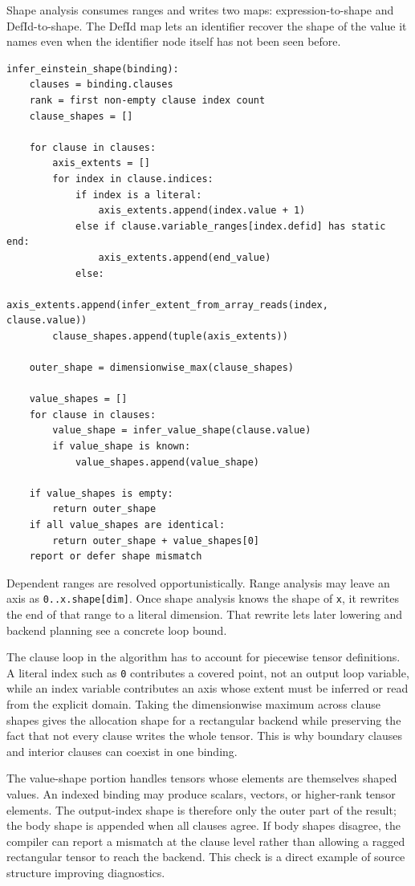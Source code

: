 Shape analysis consumes ranges and writes two maps: expression-to-shape and
DefId-to-shape. The DefId map lets an identifier recover the shape of the value
it names even when the identifier node itself has not been seen before.

\begin{lstlisting}[style=pythoncode,caption={Einstein shape inference.}]
infer_einstein_shape(binding):
    clauses = binding.clauses
    rank = first non-empty clause index count
    clause_shapes = []

    for clause in clauses:
        axis_extents = []
        for index in clause.indices:
            if index is a literal:
                axis_extents.append(index.value + 1)
            else if clause.variable_ranges[index.defid] has static end:
                axis_extents.append(end_value)
            else:
                axis_extents.append(infer_extent_from_array_reads(index, clause.value))
        clause_shapes.append(tuple(axis_extents))

    outer_shape = dimensionwise_max(clause_shapes)

    value_shapes = []
    for clause in clauses:
        value_shape = infer_value_shape(clause.value)
        if value_shape is known:
            value_shapes.append(value_shape)

    if value_shapes is empty:
        return outer_shape
    if all value_shapes are identical:
        return outer_shape + value_shapes[0]
    report or defer shape mismatch
\end{lstlisting}

Dependent ranges are resolved opportunistically. Range analysis may leave an
axis as \texttt{0..x.shape[dim]}. Once shape analysis knows the shape of
\texttt{x}, it rewrites the end of that range to a literal dimension. That
rewrite lets later lowering and backend planning see a concrete loop bound.

The clause loop in the algorithm has to account for piecewise tensor
definitions. A literal index such as \texttt{0} contributes a covered point, not
an output loop variable, while an index variable contributes an axis whose
extent must be inferred or read from the explicit domain. Taking the
dimensionwise maximum across clause shapes gives the allocation shape for a
rectangular backend while preserving the fact that not every clause writes the
whole tensor. This is why boundary clauses and interior clauses can coexist in
one binding.

The value-shape portion handles tensors whose elements are themselves shaped
values. An indexed binding may produce scalars, vectors, or higher-rank tensor
elements. The output-index shape is therefore only the outer part of the result;
the body shape is appended when all clauses agree. If body shapes disagree, the
compiler can report a mismatch at the clause level rather than allowing a
ragged rectangular tensor to reach the backend. This check is a direct example
of source structure improving diagnostics.

